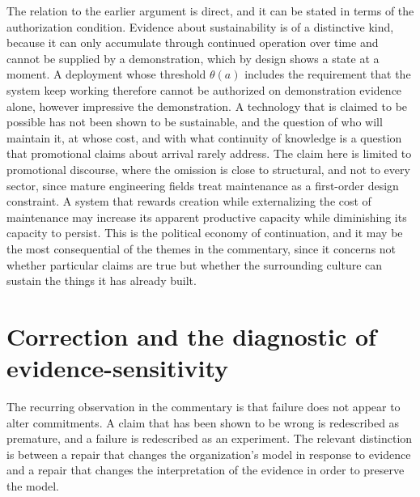 \documentclass[11pt]{article}
\theoremstyle{plain}
\theoremstyle{definition}
\theoremstyle{remark}
\begin{document}
The relation to the earlier argument is direct, and it can be stated in terms of the authorization condition. Evidence about sustainability is of a distinctive kind, because it can only accumulate through continued operation over time and cannot be supplied by a demonstration, which by design shows a state at a moment. A deployment whose threshold $\theta(a)$ includes the requirement that the system keep working therefore cannot be authorized on demonstration evidence alone, however impressive the demonstration. A technology that is claimed to be possible has not been shown to be sustainable, and the question of who will maintain it, at whose cost, and with what continuity of knowledge is a question that promotional claims about arrival rarely address. The claim here is limited to promotional discourse, where the omission is close to structural, and not to every sector, since mature engineering fields treat maintenance as a first-order design constraint. A system that rewards creation while externalizing the cost of maintenance may increase its apparent productive capacity while diminishing its capacity to persist. This is the political economy of continuation, and it may be the most consequential of the themes in the commentary, since it concerns not whether particular claims are true but whether the surrounding culture can sustain the things it has already built.

\section{Correction and the diagnostic of evidence-sensitivity}

The recurring observation in the commentary is that failure does not appear to alter commitments. A claim that has been shown to be wrong is redescribed as premature, and a failure is redescribed as an experiment. The relevant distinction is between a repair that changes the organization's model in response to evidence and a repair that changes the interpretation of the evidence in order to preserve the model.
\end{document}
